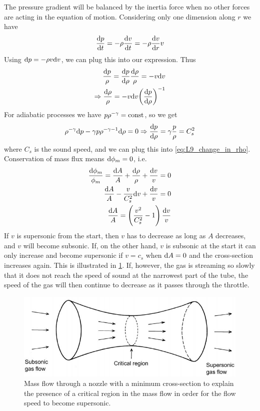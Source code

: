 The pressure gradient will be balanced by the inertia force when no other forces are acting in the equation of motion. Considering only one dimension along \(r\) we have
\begin{equation*}
    \fracd{p}=-\rho\fracd{v}=-\rho\fracd[r]{v}v
\end{equation*}
Using \(\tn{d}p=-\rho v\tn{d}v\), we can plug this into our expression. Thus
\begin{align}
    \frac{\tn{d}p}{\rho}=\fracd[\rho]{p}\frac{\tn{d}\rho}{\rho}=-v\tn{d}v\notag \\
    \Rightarrow \frac{\tn{d}\rho}{\rho}=-v\tn{d}v{\left(\fracd[\rho]{p}\right)}^{-1}\label{eq:L9_change_in_rho}
\end{align}
For adiabatic processes we have \(p\rho^{-\gamma}=\tn{const}\), so we get
\begin{equation}\label{eq:L9_sound_speed_relation}
    \rho^{-\gamma}\tn{d}p-\gamma p\rho^{-\gamma-1}\tn{d}\rho=0\Rightarrow\fracd[\rho]{p}=\gamma\frac{p}{\rho}=C_s^2
\end{equation}
where \(C_s\) is the sound speed, and we can plug this into \cref{eq:L9_change_in_rho}. Conservation of mass flux means \(\tn{d}\phi_m=0\), i.e.
\begin{align*}
    \frac{\tn{d}\phi_m}{\phi_m}=\frac{\tn{d}A}{A}+\frac{\tn{d}\rho}{\rho}+\frac{\tn{d}v}{v}=0\\
    \frac{\tn{d}A}{A}-\frac{v}{C_s^2}\tn{d}v+\frac{\tn{d}v}{v}=0\\
    \frac{\tn{d}A}{A}=\left(\frac{v^2}{C_s^2}-1\right)\frac{\tn{d}v}{v}
\end{align*}
If \(v\) is supersonic from the start, then \(v\) has to decrease as long as \(A\) decreases, and \(v\) will become subsonic. If, on the other hand, \(v\) is subsonic at the start it can only increase and become supersonic if \(v=c_s\) when \(\tn{d}A=0\) and the cross-section increases again. This is illustrated in \cref{fig:L9_mass_flow_through_nozzle}. If, however, the gas is streaming so slowly that it does not reach the speed of sound at the narrowest part of the tube, the speed of the gas will then continue to decrease as it passes through the throttle.
\begin{figure}[t]
    \centering
    \includegraphics[width=.8\linewidth]{bilder/L9_mass_flow_through_nozzle.jpg}
    \caption{Mass flow through a nozzle with a minimum cross-section to explain the presence of a critical region in the mass flow in order for the flow speed to become supersonic.}\label{fig:L9_mass_flow_through_nozzle}
\end{figure}

